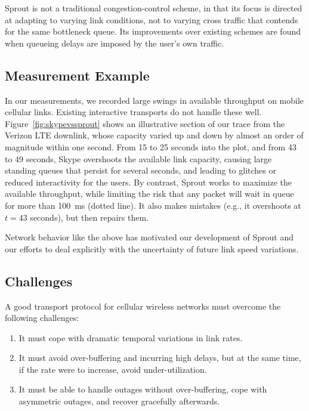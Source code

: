 Sprout is not a traditional congestion-control scheme, in that its
focus is directed at adapting to varying link conditions, not to
varying cross traffic that contends for the same bottleneck queue. Its
improvements over existing schemes are found when queueing delays are
imposed by the user's own traffic.%

\subsection{Measurement Example}

In our measurements, we recorded large swings in available throughput
on mobile cellular links. Existing interactive transports do
not handle these well. Figure~\ref{fig:skypevssprout} shows an
illustrative section of our trace from the Verizon LTE downlink, whose
capacity varied up and down by almost an order of magnitude within one
second. From 15 to 25 seconds into the plot, and from 43 to 49 seconds,
Skype overshoots the available link capacity, causing large standing
queues that persist for several seconds, and leading to glitches or
reduced interactivity for the users. By contrast, Sprout works to
maximize the available throughput, while limiting the risk that any
packet will wait in queue for more than 100~ms (dotted line). It also
makes mistakes (e.g., it overshoots at $t=43$ seconds), but then
repairs them.

Network behavior like the above has motivated our development of
Sprout and our efforts to deal explicitly with the uncertainty of
future link speed variations.

\subsection{Challenges}

A good transport protocol for cellular wireless networks
must overcome the following challenges:
\begin{enumerate}
\item It must cope with dramatic temporal variations in link rates.
\item It must avoid over-buffering and incurring high delays, but at
  the same time, if the rate were to increase, avoid
  under-utilization.
\item It must be able to handle outages without over-buffering, cope
  with asymmetric outages, and recover gracefully afterwards.
\end{enumerate}

